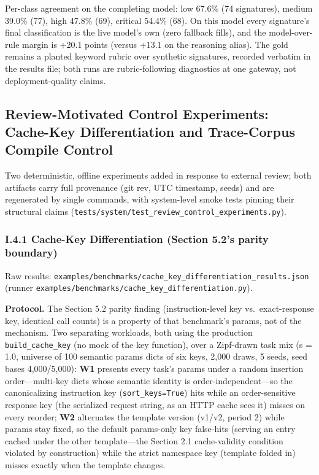 \documentclass[
  11pt,
]{article}
\begin{document}
Per-class agreement on the completing model: low 67.6\% (74 signatures),
medium 39.0\% (77), high 47.8\% (69), critical 54.4\% (68). On this
model every signature's final classification is the live model's own
(zero fallback fills), and the model-over-rule margin is +20.1 points
(versus +13.1 on the reasoning alias). The gold remains a planted
keyword rubric over synthetic signatures, recorded verbatim in the
results file; both runs are rubric-following diagnostics at one gateway,
not deployment-quality claims.

\subsection{Review-Motivated Control Experiments: Cache-Key
Differentiation and Trace-Corpus Compile
Control}\label{review-motivated-control-experiments-cache-key-differentiation-and-trace-corpus-compile-control}

Two deterministic, offline experiments added in response to external
review; both artifacts carry full provenance (git rev, UTC timestamp,
seeds) and are regenerated by single commands, with system-level smoke
tests pinning their structural claims
(\texttt{tests/system/test\_review\_control\_experiments.py}).

\subsubsection{I.4.1 Cache-Key Differentiation (Section 5.2's parity
boundary)}\label{i.4.1-cache-key-differentiation-section-5.2s-parity-boundary}

Raw results:
\texttt{examples/benchmarks/cache\_key\_differentiation\_results.json}
(runner \texttt{examples/benchmarks/cache\_key\_differentiation.py}).

\textbf{Protocol.} The Section 5.2 parity finding (instruction-level key
vs.~exact-response key, identical call counts) is a property of that
benchmark's params, not of the mechanism. Two separating workloads, both
using the production \texttt{build\_cache\_key} (no mock of the key
function), over a Zipf-drawn task mix (s = 1.0, universe of 100 semantic
params dicts of six keys, 2,000 draws, 5 seeds, seed bases 4,000/5,000):
\textbf{W1} presents every task's params under a random insertion
order---multi-key dicts whose semantic identity is
order-independent---so the canonicalizing instruction key
(\texttt{sort\_keys=True}) hits while an order-sensitive response key
(the serialized request string, as an HTTP cache sees it) misses on
every reorder; \textbf{W2} alternates the template version (v1/v2,
period 2) while params stay fixed, so the default params-only key
false-hits (serving an entry cached under the other template---the
Section 2.1 cache-validity condition violated by construction) while the
strict namespace key (template folded in) misses exactly when the
template changes.
\end{document}
